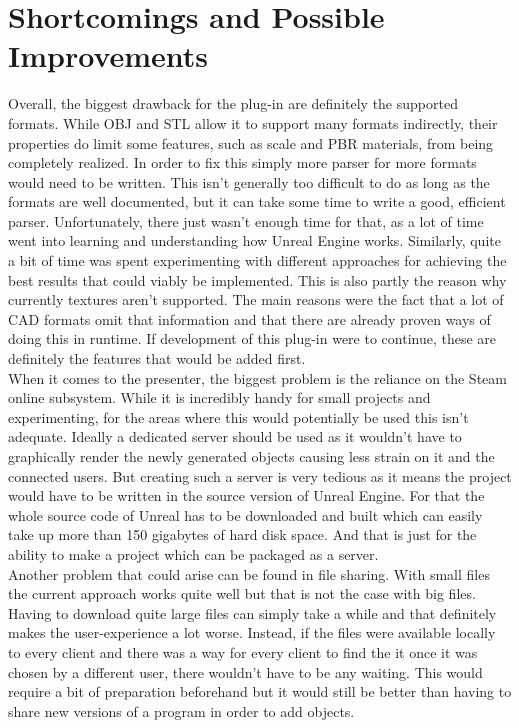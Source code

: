 \section{Shortcomings and Possible Improvements}

Overall, the biggest drawback for the plug-in are definitely the supported formats. While OBJ and STL allow it to support many formats indirectly, their properties do limit some features, such as scale and \acs{PBR} materials, from being completely realized. In order to fix this simply more parser for more formats would need to be written. This isn't generally too difficult to do as long as the formats are well documented, but it can take some time to write a good, efficient parser. Unfortunately, there just wasn't enough time for that, as a lot of time went into learning and understanding how Unreal Engine works. Similarly, quite a bit of time was spent experimenting with different approaches for achieving the best results that could viably be implemented. This is also partly the reason why currently textures aren't supported. The main reasons were the fact that a lot of \acs{CAD} formats omit that information and that there are already proven ways of doing this in runtime\cite{bib:RunTex}. If development of this plug-in were to continue, these are definitely the features that would be added first.\\
When it comes to the presenter, the biggest problem is the reliance on the Steam online subsystem. While it is incredibly handy for small projects and experimenting, for the areas where this would potentially be used this isn't adequate. Ideally a dedicated server should be used as it wouldn't have to graphically render the newly generated objects causing less strain on it and the connected users. But creating such a server is very tedious as it means the project would have to be written in the source version of Unreal Engine. For that the whole source code of Unreal has to be downloaded and built which can easily take up more than 150 gigabytes of hard disk space. And that is just for the ability to make a project which can be packaged as a server.\\ 
Another problem that could arise can be found in file sharing. With small files the current approach works quite well but that is not the case with big files. Having to download quite large files can simply take a while and that definitely makes the user-experience a lot worse. Instead, if the files were available locally to every client and there was a way for every client to find the it once it was chosen by a different user, there wouldn't have to be any waiting. This would require a bit of preparation beforehand but it would still be better than having to share new versions of a program in order to add objects.\\